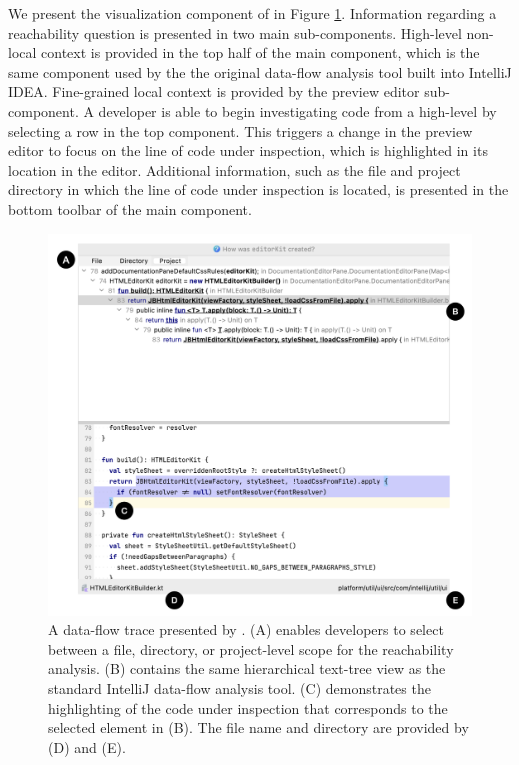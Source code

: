 \par We present the visualization component of \toolname{} in Figure
\ref{fig:ReachHoverVis}.
Information regarding a reachability question is presented in two main
sub-components.
High-level non-local context is provided in the top half of the main component,
which is the same component used by the the original data-flow analysis tool
built into IntelliJ IDEA.
Fine-grained local context is provided by the preview editor sub-component.
A developer is able to begin investigating code from a high-level by selecting
a row in the top component.
This triggers a change in the preview editor to focus on the line of code under
inspection, which is highlighted in its location in the editor.
Additional information, such as the file and project directory in which the
line of code under inspection is located, is presented in the bottom
toolbar of the main component.

\begin{figure}[ht]
\centering
\includegraphics[width=\textwidth]{./figs/reach-hover-vis.png}
\caption{
  A data-flow trace presented by \toolname{}. (A) enables developers to select
  between a file, directory, or project-level scope for the reachability
  analysis. (B) contains the same hierarchical text-tree view as the standard
  IntelliJ data-flow analysis tool. (C) demonstrates the highlighting of the
  code under inspection that corresponds to the selected element in (B).
  The file name and directory are provided by (D) and (E).
}
\label{fig:ReachHoverVis}
\end{figure}

